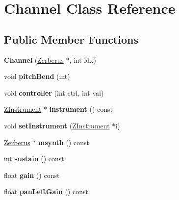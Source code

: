 \hypertarget{class_channel}{}\section{Channel Class Reference}
\label{class_channel}
\subsection*{Public Member Functions}
\begin{DoxyCompactItemize}
\item 
\mbox{\label{class_channel_ad2dacca67b8754d206e366f0df71e916}} 
{\bfseries Channel} (\hyperlink{class_zerberus}{Zerberus} $\ast$, int idx)
\item 
\mbox{\label{class_channel_ab9243d608a4fd177545fc8683cf4a097}} 
void {\bfseries pitch\+Bend} (int)
\item 
\mbox{\label{class_channel_a8c5eac93b9d67e1adea0a306ae057067}} 
void {\bfseries controller} (int ctrl, int val)
\item 
\mbox{\label{class_channel_ad4c71641deab4f88aa1f5554d43ea7bc}} 
\hyperlink{class_z_instrument}{Z\+Instrument} $\ast$ {\bfseries instrument} () const
\item 
\mbox{\label{class_channel_aff03c04044fe79e90a5806ead649f015}} 
void {\bfseries set\+Instrument} (\hyperlink{class_z_instrument}{Z\+Instrument} $\ast$i)
\item 
\mbox{\label{class_channel_abb15d06a34f42435aa5363404f28e76b}} 
\hyperlink{class_zerberus}{Zerberus} $\ast$ {\bfseries msynth} () const
\item 
\mbox{\label{class_channel_a098cfb90c0335ea2aeef1ca9cbd0b7ea}} 
int {\bfseries sustain} () const
\item 
\mbox{\label{class_channel_ad5fc2a10759e90cdbfcffc4c9b2cae58}} 
float {\bfseries gain} () const
\item 
\mbox{\label{class_channel_a2cb9a6f5a6dc26fb1b3e93fb6dbeb183}} 
float {\bfseries pan\+Left\+Gain} () const
\item 

\end{DoxyCompactItemize}
